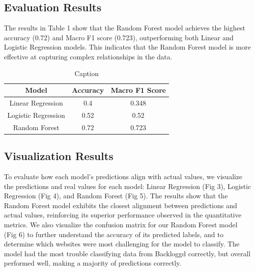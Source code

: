 \documentclass[10pt,sigconf,letterpaper,nonacm]{acmart}
\begin{document}
\subsection{Evaluation Results}
The results in Table 1 show that the Random Forest model
achieves the highest accuracy (0.72) and Macro F1 score
(0.723), outperforming both Linear and Logistic Regression
models. This indicates that the Random Forest model is more
effective at capturing complex relationships in the data.

\begin{table}
    \centering
    \begin{tabular}{ccc}
    \hline
        Model & Accuracy  & Macro F1 Score \\
        \hline
        Linear Regression &  0.4& 0.348\\
        Logistic Regression &  0.52& 0.52\\
       Random Forest &  0.72& 0.723 \\
       \hline
    \end{tabular}
    \caption{Caption}
    \label{tab:placeholder}
\end{table}
\subsection{Visualization Results}
To evaluate how each model’s predictions align with actual
values, we visualize the predictions and real values for each
model: Linear Regression (Fig 3), Logistic Regression (Fig 4),
and Random Forest (Fig 5).
The results show that the Random Forest model exhibits
the closest alignment between predictions and actual values, reinforcing its superior performance observed in the
quantitative metrics.
We also visualize the confusion matrix for our Random Forest model (Fig 6) to further understand the accuracy of its predicted labels, and to determine which websites were most challenging for the model to classify. The model had the most trouble classifying data from Backloggd correctly, but overall performed well, making a majority of predictions correctly.
\end{document}
